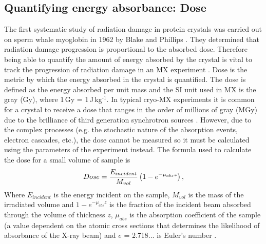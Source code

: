     \subsection{Quantifying energy absorbance: Dose}
    \label{sub:Quantifying energy absorbance: Dose}
        The first systematic study of radiation damage in protein crystals was carried out on sperm whale myoglobin in 1962 by Blake and Phillips \cite{blake1962}.
        They determined that radiation damage progression is proportional to the absorbed dose.
        Therefore being able to quantify the amount of energy absorbed by the crystal is vital to track the progression of radiation damage in an MX experiment \cite{blake1962,holton2009}.
        Dose is the metric by which the energy absorbed in the crystal is quantified.
        The dose is defined as the energy absorbed per unit mass and the SI unit used in MX is the gray (Gy), where 1\,Gy = 1\,J\,kg$^{\text{-1}}$.
        In typical cryo-MX experiments it is common for a crystal to receive a dose that ranges in the order of millions of gray (MGy) \cite{garman2010} due to the brilliance of third generation synchrotron sources \cite{mitchell1999}.
        However, due to the complex processes (e.g. the stochastic nature of the absorption events, electron cascades, etc.), the dose cannot be measured so it must be calculated using the parameters of the experiment instead.
        The formula used to calculate the dose for a small volume of sample is
        \begin{equation}
            Dose = \frac{E_{incident}}{M_{vol}} \left(1- e^{-\mu_{abs}z}\right),
            \label{eq:Dose Calculation 1D}
        \end{equation}
        Where $E_{incident}$ is the energy incident on the sample, $M_{vol}$ is the mass of the irradiated volume and $1- e^{-\mu_{abs}z}$ is the fraction of the incident beam absorbed through the volume of thickness $z$, $\mu_{abs}$ is the absorption coefficient of the sample (a value dependent on the atomic cross sections that determines the likelihood of absorbance of the X-ray beam) and $e$ = 2.718$\ldots$ is Euler's number \cite{zeldin2013thesis}.

